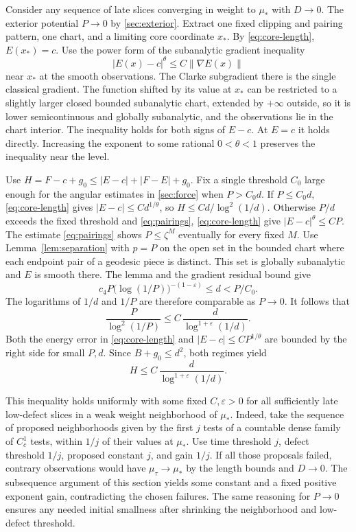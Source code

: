 Consider any sequence of late slices converging in weight to \(\mu_*\) with \(D\to0\). The exterior potential \(P\to0\) by \cref{sec:exterior}. Extract one fixed clipping and pairing pattern, one chart, and a limiting core coordinate \(x_*\). By \eqref{eq:core-length}, \(E(x_*)=c\). Use the power form of the subanalytic gradient inequality \cite[Theorem~11 and Corollary~12 of the arXiv version]{BDLS} \[
 |E(x)-c|^\theta\le C\|\nabla E(x)\|
\] near \(x_*\) at the smooth observations. The Clarke subgradient there is the single classical gradient. The function shifted by its value at \(x_*\) can be restricted to a slightly larger closed bounded subanalytic chart, extended by \(+\infty\) outside, so it is lower semicontinuous and globally subanalytic, and the observations lie in the chart interior. The inequality holds for both signs of \(E-c\). At \(E=c\) it holds directly. Increasing the exponent to some rational \(0<\theta<1\) preserves the inequality near the level.

Use \(H=F-c+g_0\le |E-c|+|F-E|+g_0\). Fix a single threshold \(C_0\) large enough for the angular estimates in \cref{sec:force} when \(P>C_0d\). If \(P\le C_0d\), \eqref{eq:core-length} gives \(|E-c|\le Cd^{1/\theta}\), so \(H\le C d/\log^2(1/d)\). Otherwise \(P/d\) exceeds the fixed threshold and \eqref{eq:pairings}, \eqref{eq:core-length} give \(|E-c|^\theta\le CP\). The estimate \eqref{eq:pairings} shows \(P\le\zeta^M\) eventually for every fixed \(M\). Use Lemma~\ref{lem:separation} with \(p=P\) on the open set in the bounded chart where each endpoint pair of a geodesic piece is distinct. This set is globally subanalytic and \(E\) is smooth there. The lemma and the gradient residual bound give
\[
c_4 P\bigl(\log(1/P)\bigr)^{-(1-\varepsilon)}\le d < P/C_0.
\]
The logarithms of \(1/d\) and \(1/P\) are therefore comparable as \(P\to0\). It follows that \[
 \frac{P}{\log^2(1/P)}\le C\,\frac{d}{\log^{1+\varepsilon}(1/d)} .
\] Both the energy error in \eqref{eq:core-length} and \(|E-c|\le C P^{1/\theta}\) are bounded by the right side for small \(P,d\). Since \(B+g_0\le d^2\), both regimes yield \begin{equation}\label{eq:log-estimate}
 H\le C\,\frac{d}{\log^{1+\varepsilon}(1/d)}.
\end{equation}

This inequality holds uniformly with some fixed \(C,\varepsilon>0\) for all sufficiently late low-defect slices in a weak weight neighborhood of \(\mu_*\). Indeed, take the sequence of proposed neighborhoods given by the first \(j\) tests of a countable dense family of \(C_c^1\) tests, within \(1/j\) of their values at \(\mu_*\). Use time threshold \(j\), defect threshold \(1/j\), proposed constant \(j\), and gain \(1/j\). If all those proposals failed, contrary observations would have \(\mu_\tau\to\mu_*\) by the length bounds and \(D\to0\). The subsequence argument of this section yields some constant and a fixed positive exponent gain, contradicting the chosen failures. The same reasoning for \(P\to0\) ensures any needed initial smallness after shrinking the neighborhood and low-defect threshold.

